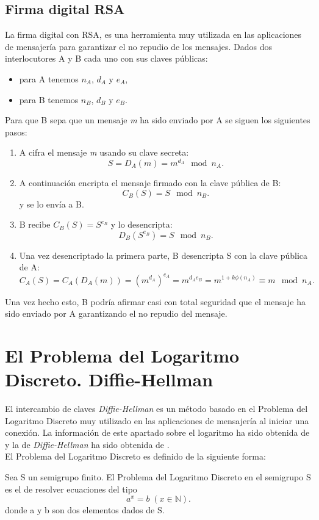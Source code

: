 \subsection{Firma digital RSA}
La firma digital con RSA, es una herramienta muy utilizada en las aplicaciones de mensajería para garantizar el no repudio de los mensajes.
Dados dos interlocutores A y B cada uno con sus claves públicas:
\begin{itemize}
	\item para A tenemos $n_A$, $d_A$ y $e_A$,  
	\item para B tenemos $n_B$, $d_B$ y $e_B$.  
\end{itemize}
Para que B sepa que un mensaje \emph{m} ha sido enviado por A se siguen los siguientes pasos:
\begin{enumerate}
	\item A cifra el mensaje \emph{m} usando su clave secreta:
		$$
			S=D_A(m)=m^{d_A} \mod n_A.
		$$
	\item A continuación encripta el mensaje firmado con la clave pública de B:
		$$
			C_B(S)=S\mod n_B.
		$$
		y se lo envía a B.
	\item B recibe $C_B(S)=S^{e_B}$ y lo desencripta: 
		$$
			D_B(S^{e_B})=S \mod n_B.
		$$
	\item Una vez desencriptado la primera parte, B desencripta S con la clave pública de A:
		$$
			C_A(S)=C_A(D_A(m))=(m^{d_A})^{e_A}=m^{d_Ae_B}=m^{1+k\phi(n_A)}\equiv m \mod n_A.
		$$
\end{enumerate}
Una vez hecho esto, B podría afirmar casi con total seguridad que el mensaje ha sido enviado por A garantizando el no repudio del mensaje.

\section{El Problema del Logaritmo Discreto. Diffie-Hellman}
El intercambio de claves \emph{Diffie-Hellman} es un método basado en el Problema del Logaritmo Discreto muy utilizado en las aplicaciones de mensajería al iniciar una conexión. La información de este apartado sobre el logaritmo ha sido obtenida de \cite{angelRiosMateos} y la de \emph{Diffie-Hellman} ha sido obtenida de \cite{En2011}.\\
El Problema del Logaritmo Discreto es definido de la siguiente forma:
\begin{definicion}
	Sea S un semigrupo finito. El Problema del Logaritmo Discreto en el semigrupo S es el de resolver ecuaciones del tipo\\
		$$
			a^x\!=b\;(x\in \mathbb{N}).
		$$
	donde a y b son dos elementos dados de S.
\end{definicion}

